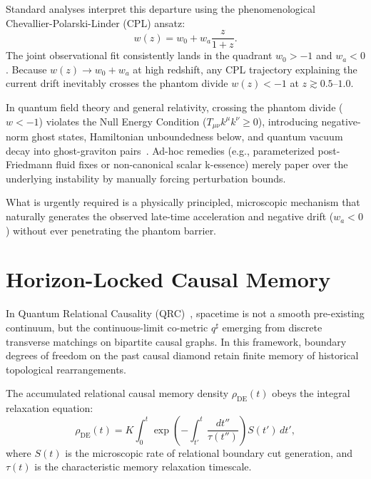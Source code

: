 \documentclass[10pt,twocolumn]{article}
\begin{document}
Standard analyses interpret this departure using the phenomenological Chevallier-Polarski-Linder (CPL) ansatz:
\begin{equation}
w(z) = w_0 + w_a \frac{z}{1+z}.
\label{eq:cpl}
\end{equation}
The joint observational fit consistently lands in the quadrant $w_0 > -1$ and $w_a < 0$. Because $w(z) \to w_0 + w_a$ at high redshift, any CPL trajectory explaining the current drift inevitably crosses the phantom divide $w(z) < -1$ at $z \gtrsim 0.5$--$1.0$.

In quantum field theory and general relativity, crossing the phantom divide ($w < -1$) violates the Null Energy Condition ($T_{\mu\nu}k^\mu k^\nu \ge 0$), introducing negative-norm ghost states, Hamiltonian unboundedness below, and quantum vacuum decay into ghost-graviton pairs~\cite{carroll2003}. Ad-hoc remedies (e.g., parameterized post-Friedmann fluid fixes or non-canonical scalar k-essence) merely paper over the underlying instability by manually forcing perturbation bounds. 

What is urgently required is a physically principled, microscopic mechanism that naturally generates the observed late-time acceleration and negative drift ($w_a < 0$) without ever penetrating the phantom barrier.

\section{Horizon-Locked Causal Memory}
In Quantum Relational Causality (QRC)~\cite{hendrixx2026}, spacetime is not a smooth pre-existing continuum, but the continuous-limit co-metric $q^\sharp$ emerging from discrete transverse matchings on bipartite causal graphs. In this framework, boundary degrees of freedom on the past causal diamond retain finite memory of historical topological rearrangements.

The accumulated relational causal memory density $\rho_{\mathrm{DE}}(t)$ obeys the integral relaxation equation:
\begin{equation}
\rho_{\mathrm{DE}}(t) = K \int_0^t \exp\left(-\int_{t'}^t \frac{dt''}{\tau(t'')}\right) S(t')\,dt',
\label{eq:memory_integral}
\end{equation}
where $S(t)$ is the microscopic rate of relational boundary cut generation, and $\tau(t)$ is the characteristic memory relaxation timescale.
\end{document}

